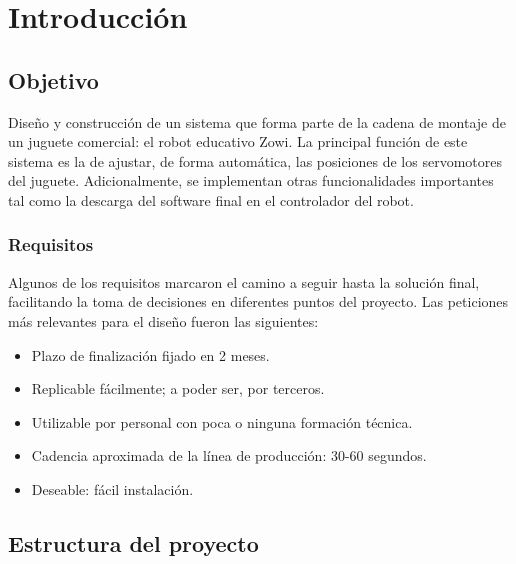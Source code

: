 
\chapter{Introducción} %

\label{Chapter1} %


\section{Objetivo}

Diseño y construcción de un sistema que forma parte de la cadena de montaje de un juguete comercial: el robot educativo Zowi. La principal función de este sistema es la de ajustar, de forma automática, las posiciones de los servomotores del juguete. Adicionalmente, se implementan otras funcionalidades importantes tal como la descarga del software final en el controlador del robot.

\subsection{Requisitos}

Algunos de los requisitos marcaron el camino a seguir hasta la solución final, facilitando la toma de decisiones en diferentes puntos del proyecto. Las peticiones más relevantes para el diseño fueron las siguientes:
\begin{itemize}
  \item Plazo de finalización fijado en 2 meses.
  \item Replicable fácilmente; a poder ser, por terceros.
  \item Utilizable por personal con poca o ninguna formación técnica.
  \item Cadencia aproximada de la línea de producción: 30-60 segundos.
  \item Deseable: fácil instalación.
\end{itemize}

\section{Estructura del proyecto}


